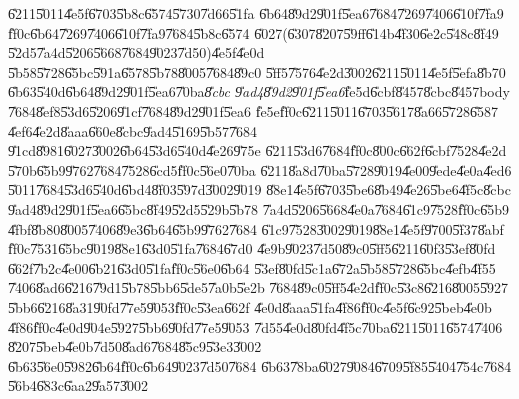 \documentclass[12pt,a4paper]{article}
\begin{document}
\U{6211}\U{5011}\U{4e5f}\U{6703}\U{5b8c}\U{6574}\U{5730}\U{7d66}\U{51fa}%
\U{6b64}\U{89d2}\U{901f}\U{5ea6}\U{7684}\U{7269}\U{7406}\U{610f}\U{7fa9}%
\U{ff0c}\U{6b64}\U{7269}\U{7406}\U{610f}\U{7fa9}\U{7684}\U{5b8c}\U{6574}%
\U{6027}(\U{6307}\U{8207}\U{59ff}\U{614b}\U{4f30}\U{6e2c}\U{548c}\U{8f49}%
\U{52d5}\U{7a4d}\U{5206}\U{5668}\U{7684}\U{9023}\U{7d50})\U{4e5f}\U{4e0d}%
\U{5b58}\U{5728}\U{65bc}\U{591a}\U{6578}\U{5b78}\U{8005}\U{7684}\U{89c0}%
\U{5ff5}\U{7576}\U{4e2d}\U{3002}\U{6211}\U{5011}\U{4e5f}\U{5efa}\U{8b70}%
\U{6b63}\U{540d}\U{6b64}\U{89d2}\U{901f}\U{5ea6}\U{70ba}\emph{\U{8cbc}%
\U{9ad4}\U{89d2}\U{901f}\U{5ea6}}\U{fe5d}\U{6cbf}\U{8457}\U{8cbc}\U{8457}body%
\U{7684}\U{8ef8}\U{53d6}\U{5206}\U{91cf}\U{7684}\U{89d2}\U{901f}\U{5ea6}%
\U{fe5e}\U{ff0c}\U{6211}\U{5011}\U{6703}\U{5617}\U{8a66}\U{5728}\U{6587}%
\U{4ef6}\U{4e2d}\U{8aaa}\U{660e}\U{8cbc}\U{9ad4}\U{5169}\U{5b57}\U{7684}%
\U{91cd}\U{8981}\U{6027}\U{3002}\U{6b64}\U{53d6}\U{540d}\U{4e26}\U{975e}%
\U{6211}\U{53d6}\U{7684}\U{ff0c}\U{800c}\U{662f}\U{6cbf}\U{7528}\U{4e2d}%
\U{570b}\U{65b9}\U{9762}\U{7684}\U{7528}\U{6cd5}\U{ff0c}\U{56e0}\U{70ba}%
\U{6211}\U{8a8d}\U{70ba}\U{5728}\U{9019}\U{4e00}\U{9ede}\U{4e0a}\U{4ed6}%
\U{5011}\U{7684}\U{53d6}\U{540d}\U{6bd4}\U{8f03}\U{597d}\U{3002}\U{9019}%
\U{88e1}\U{4e5f}\U{6703}\U{5be6}\U{8b49}\U{4e26}\U{5be6}\U{4f5c}\U{8cbc}%
\U{9ad4}\U{89d2}\U{901f}\U{5ea6}\U{65bc}\U{8f49}\U{52d5}\U{529b}\U{5b78}%
\U{7a4d}\U{5206}\U{5668}\U{4e0a}\U{7684}\U{61c9}\U{7528}\U{ff0c}\U{65b9}%
\U{4fbf}\U{8b80}\U{8005}\U{7406}\U{89e3}\U{6b64}\U{65b9}\U{9762}\U{7684}%
\U{61c9}\U{7528}\U{3002}\U{9019}\U{88e1}\U{4e5f}\U{9700}\U{5f37}\U{8abf}%
\U{ff0c}\U{7531}\U{65bc}\U{9019}\U{88e1}\U{63d0}\U{51fa}\U{7684}\U{67d0}%
\U{4e9b}\U{9023}\U{7d50}\U{89c0}\U{5ff5}\U{6211}\U{60f3}\U{53ef}\U{80fd}%
\U{662f}\U{7b2c}\U{4e00}\U{6b21}\U{63d0}\U{51fa}\U{ff0c}\U{56e0}\U{6b64}%
\U{53ef}\U{80fd}\U{5c1a}\U{672a}\U{5b58}\U{5728}\U{65bc}\U{4efb}\U{4f55}%
\U{7406}\U{8ad6}\U{6216}\U{79d1}\U{5b78}\U{5bb6}\U{5de5}\U{7a0b}\U{5e2b}%
\U{7684}\U{89c0}\U{5ff5}\U{4e2d}\U{ff0c}\U{53c8}\U{6216}\U{8005}\U{5927}%
\U{5bb6}\U{6216}\U{8a31}\U{90fd}\U{77e5}\U{9053}\U{ff0c}\U{53ea}\U{662f}%
\U{4e0d}\U{8aaa}\U{51fa}\U{4f86}\U{ff0c}\U{4e5f}\U{6c92}\U{5beb}\U{4e0b}%
\U{4f86}\U{ff0c}\U{4e0d}\U{904e}\U{5927}\U{5bb6}\U{90fd}\U{77e5}\U{9053}%
\U{7d55}\U{4e0d}\U{80fd}\U{4f5c}\U{70ba}\U{6211}\U{5011}\U{6574}\U{7406}%
\U{8207}\U{5beb}\U{4e0b}\U{7d50}\U{8ad6}\U{7684}\U{85c9}\U{53e3}\U{3002}%
\U{6b63}\U{56e0}\U{5982}\U{6b64}\U{ff0c}\U{6b64}\U{9023}\U{7d50}\U{7684}%
\U{6b63}\U{78ba}\U{6027}\U{9084}\U{6709}\U{5f85}\U{5404}\U{754c}\U{7684}%
\U{56b4}\U{683c}\U{6aa2}\U{9a57}\U{3002}
\end{document}
